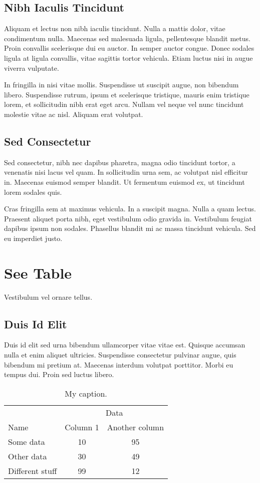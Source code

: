 \documentclass{article}
\begin{document}
\subsection{Nibh Iaculis Tincidunt}
Aliquam et lectus non nibh iaculis tincidunt. 
Nulla a mattis dolor, vitae condimentum nulla. 
Maecenas sed malesuada ligula, pellentesque blandit metus. 
Proin convallis scelerisque dui eu auctor. 
In semper auctor congue. 
Donec sodales ligula at ligula convallis, vitae sagittis tortor vehicula. 
Etiam luctus nisi in augue viverra vulputate. 


In fringilla in nisi vitae mollis. 
Suspendisse ut suscipit augue, non bibendum libero. 
Suspendisse rutrum, ipsum et scelerisque tristique, mauris enim tristique lorem, et sollicitudin nibh erat eget arcu. 
Nullam vel neque vel nunc tincidunt molestie vitae ac nisl. 
Aliquam erat volutpat.
\subsection{Sed Consectetur}
Sed consectetur, nibh nec dapibus pharetra, magna odio tincidunt tortor, a venenatis nisi lacus vel quam. 
In sollicitudin urna sem, ac volutpat nisl efficitur in. 
Maecenas euismod semper blandit. 
Ut fermentum euismod ex, ut tincidunt lorem sodales quis. 


Cras fringilla sem at maximus vehicula. 
In a suscipit magna. 
Nulla a quam lectus. 
Praesent aliquet porta nibh, eget vestibulum odio gravida in. 
Vestibulum feugiat dapibus ipsum non sodales. 
Phasellus blandit mi ac massa tincidunt vehicula. 
Sed eu imperdiet justo.
\newpage
\section{See Table}
Vestibulum vel ornare tellus. 
\subsection{Duis Id Elit}
Duis id elit sed urna bibendum ullamcorper vitae vitae est. 
Quisque accumsan nulla et enim aliquet ultricies. 
Suspendisse consectetur pulvinar augue, quis bibendum mi pretium at. 
Maecenas interdum volutpat porttitor. 
Morbi eu tempus dui. 
Proin sed luctus libero.
\begin{table}[ht]
    \centering
	\begin{tabular}{lcc}
		\toprule
		& \multicolumn{2}{c}{Data} \\ \cmidrule(lr){2-3}
		Name & Column 1 & Another column \\
		\midrule
		Some data & 10 & 95 \\
		Other data & 30 & 49 \\
		\addlinespace
		Different stuff & 99 & 12 \\
		\bottomrule
	\end{tabular}
	\caption{My caption.}
	\label{tab-label}
\end{table}
\end{document}
